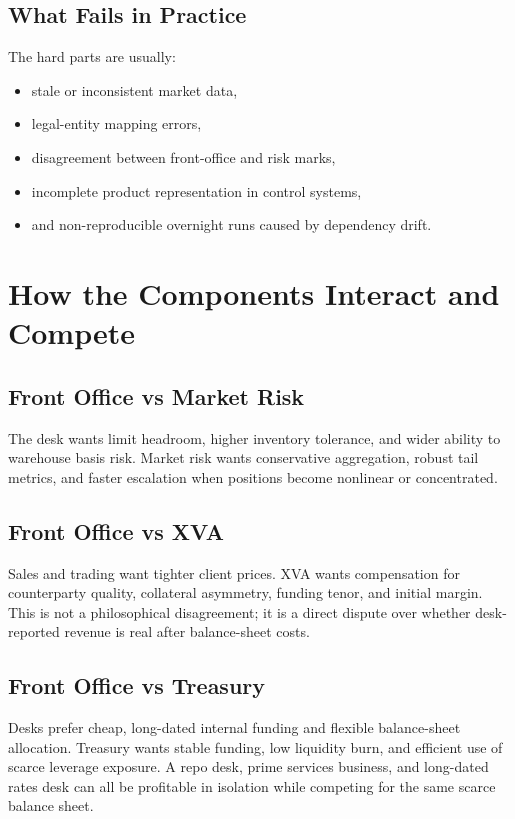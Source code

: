 \documentclass{apex_mdd}
\begin{document}
\subsection{What Fails in Practice}

The hard parts are usually:
\begin{itemize}
  \item stale or inconsistent market data,
  \item legal-entity mapping errors,
  \item disagreement between front-office and risk marks,
  \item incomplete product representation in control systems,
  \item and non-reproducible overnight runs caused by dependency drift.
\end{itemize}

\section{How the Components Interact and Compete}

\subsection{Front Office vs Market Risk}

The desk wants limit headroom, higher inventory tolerance, and wider ability to warehouse basis risk. Market risk wants conservative aggregation, robust tail metrics, and faster escalation when positions become nonlinear or concentrated.

\subsection{Front Office vs XVA}

Sales and trading want tighter client prices. XVA wants compensation for counterparty quality, collateral asymmetry, funding tenor, and initial margin. This is not a philosophical disagreement; it is a direct dispute over whether desk-reported revenue is real after balance-sheet costs.

\subsection{Front Office vs Treasury}

Desks prefer cheap, long-dated internal funding and flexible balance-sheet allocation. Treasury wants stable funding, low liquidity burn, and efficient use of scarce leverage exposure. A repo desk, prime services business, and long-dated rates desk can all be profitable in isolation while competing for the same scarce balance sheet.
\end{document}
